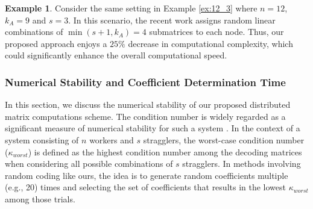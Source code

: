 \documentclass[conference]{IEEEtran}
\theoremstyle{definition}
\newtheorem{example}{Example}
\newcommand{\calO}{\mathcal{O}}
\newcommand{\bfA}{\mathbf{A}}
\newcommand{\bfx}{\mathbf{x}}
\begin{document}
\begin{example}
Consider the same setting in Example \ref{ex:12_3} where $n = 12$, $k_A = 9$ and $s = 3$. In this scenario, the recent work \cite{das2023jsait_submitted} assigns random linear combinations of $\min(s+1, k_A) = 4$ submatrices to each node. Thus, our proposed approach enjoys a $25\%$ decrease in computational complexity, which could significantly enhance the overall computational speed.
\end{example}


\subsubsection{Numerical Stability and Coefficient Determination Time}
\label{sec:trialtime}
In this section, we discuss the numerical stability of our proposed distributed matrix computations scheme. The condition number is widely regarded as a significant measure of numerical stability for such a system \cite{das2019random, 8849468, 8919859}. In the context of a system consisting of $n$ workers and $s$ stragglers, the worst-case condition number ($\kappa_{worst}$) is defined as the highest condition number among the decoding matrices when considering all possible combinations of $s$ stragglers. In methods involving random coding like ours, the idea is to generate random coefficients multiple (e.g., 20) times  and selecting the set of coefficients that results in the lowest $\kappa_{worst}$ among those trials.
\end{document}
